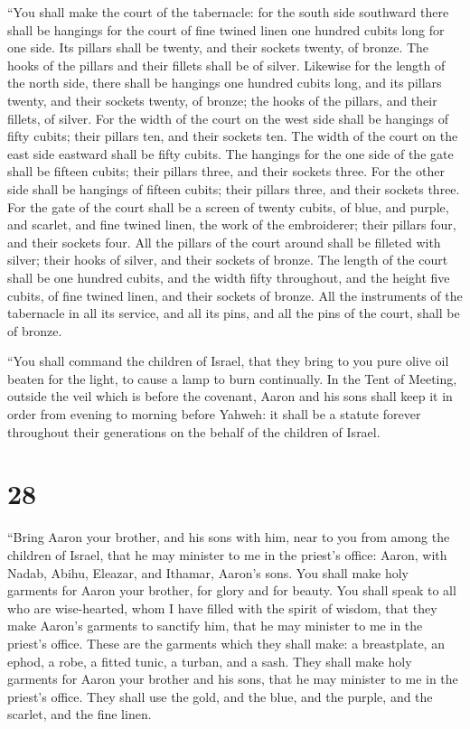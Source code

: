  ``You shall make the court of the tabernacle: for the south
side southward there shall be hangings for the court of fine twined
linen one hundred cubits long for one side.  Its pillars
shall be twenty, and their sockets twenty, of bronze. The hooks of the
pillars and their fillets shall be of silver.  Likewise for
the length of the north side, there shall be hangings one hundred cubits
long, and its pillars twenty, and their sockets twenty, of bronze; the
hooks of the pillars, and their fillets, of silver.  For
the width of the court on the west side shall be hangings of fifty
cubits; their pillars ten, and their sockets ten.  The
width of the court on the east side eastward shall be fifty cubits.
 The hangings for the one side of the gate shall be fifteen
cubits; their pillars three, and their sockets three.  For
the other side shall be hangings of fifteen cubits; their pillars three,
and their sockets three.  For the gate of the court shall
be a screen of twenty cubits, of blue, and purple, and scarlet, and fine
twined linen, the work of the embroiderer; their pillars four, and their
sockets four.  All the pillars of the court around shall be
filleted with silver; their hooks of silver, and their sockets of
bronze.  The length of the court shall be one hundred
cubits, and the width fifty throughout, and the height five cubits, of
fine twined linen, and their sockets of bronze.  All the
instruments of the tabernacle in all its service, and all its pins, and
all the pins of the court, shall be of bronze.

 ``You shall command the children of Israel, that they
bring to you pure olive oil beaten for the light, to cause a lamp to
burn continually.  In the Tent of Meeting, outside the veil
which is before the covenant, Aaron and his sons shall keep it in order
from evening to morning before Yahweh: it shall be a statute forever
throughout their generations on the behalf of the children of Israel.

\hypertarget{section-27}{%
\section{28}\label{section-27}}

 ``Bring Aaron your brother, and his sons with him, near to
you from among the children of Israel, that he may minister to me in the
priest's office: Aaron, with Nadab, Abihu, Eleazar, and Ithamar, Aaron's
sons.  You shall make holy garments for Aaron your brother,
for glory and for beauty.  You shall speak to all who are
wise-hearted, whom I have filled with the spirit of wisdom, that they
make Aaron's garments to sanctify him, that he may minister to me in the
priest's office.  These are the garments which they shall
make: a breastplate, an ephod, a robe, a fitted tunic, a turban, and a
sash. They shall make holy garments for Aaron your brother and his sons,
that he may minister to me in the priest's office.  They
shall use the gold, and the blue, and the purple, and the scarlet, and
the fine linen.

